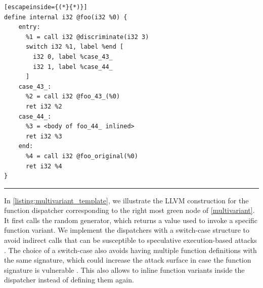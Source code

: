 \begin{minipage}[t]{0.9\linewidth}
\scriptsize
\centering
\noindent\begin{minipage}[b]{\linewidth}
    \begin{minipage}[t]{1\linewidth}
        \begin{lstlisting}[escapeinside={(*}{*)}]
define internal i32 @foo(i32 %0) {
    entry:
      %1 = call i32 @discriminate(i32 3)
      switch i32 %1, label %end [
        i32 0, label %case_43_
        i32 1, label %case_44_
      ]
    case_43_:                 
      %2 = call i32 @foo_43_(%0)
      ret i32 %2
    case_44_:                
      %3 = <body of foo_44_ inlined>
      ret i32 %3
    end:                                             
      %4 = call i32 @foo_original(%0)
      ret i32 %4
}
        \end{lstlisting}
    \end{minipage}%
    
    \noindent\rule{\linewidth}{0.4pt}
    \label{listing:multivariant_template}
\end{minipage}
\end{minipage}

In  \autoref{listing:multivariant_template}, we illustrate the LLVM construction for the function dispatcher corresponding to the right most green node of \autoref{multivariant}.
It first calls the random generator, which returns a value used to invoke a specific function variant. 
We implement the dispatchers with a switch-case structure to avoid indirect calls that can be susceptible to speculative execution-based attacks \cite{Narayan2021Swivel}. 
The choice of a switch-case also avoids having multiple function definitions with the same signature, which could increase the attack surface in case the function signature is vulnerable \cite{johnson2021}.
This also allows \tool to inline function variants inside the dispatcher instead of defining them again.



